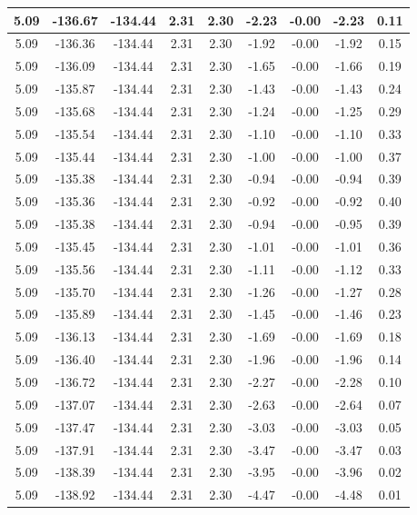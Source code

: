 \begin{table}[htbp]
\begin{adjustbox}{angle=90}
\begin{tabular}{|c|c|c|c|c|c|c|c|c|}
 5.09 & -136.67 & -134.44 & 2.31 & 2.30 & -2.23 & -0.00 & -2.23 & 0.11\\ \hline
 5.09 & -136.36 & -134.44 & 2.31 & 2.30 & -1.92 & -0.00 & -1.92 & 0.15\\ \hline
 5.09 & -136.09 & -134.44 & 2.31 & 2.30 & -1.65 & -0.00 & -1.66 & 0.19\\ \hline
 5.09 & -135.87 & -134.44 & 2.31 & 2.30 & -1.43 & -0.00 & -1.43 & 0.24\\ \hline
 5.09 & -135.68 & -134.44 & 2.31 & 2.30 & -1.24 & -0.00 & -1.25 & 0.29\\ \hline
 5.09 & -135.54 & -134.44 & 2.31 & 2.30 & -1.10 & -0.00 & -1.10 & 0.33\\ \hline
 5.09 & -135.44 & -134.44 & 2.31 & 2.30 & -1.00 & -0.00 & -1.00 & 0.37\\ \hline
 5.09 & -135.38 & -134.44 & 2.31 & 2.30 & -0.94 & -0.00 & -0.94 & 0.39\\ \hline
 5.09 & -135.36 & -134.44 & 2.31 & 2.30 & -0.92 & -0.00 & -0.92 & 0.40\\ \hline
 5.09 & -135.38 & -134.44 & 2.31 & 2.30 & -0.94 & -0.00 & -0.95 & 0.39\\ \hline
 5.09 & -135.45 & -134.44 & 2.31 & 2.30 & -1.01 & -0.00 & -1.01 & 0.36\\ \hline
 5.09 & -135.56 & -134.44 & 2.31 & 2.30 & -1.11 & -0.00 & -1.12 & 0.33\\ \hline
 5.09 & -135.70 & -134.44 & 2.31 & 2.30 & -1.26 & -0.00 & -1.27 & 0.28\\ \hline
 5.09 & -135.89 & -134.44 & 2.31 & 2.30 & -1.45 & -0.00 & -1.46 & 0.23\\ \hline
 5.09 & -136.13 & -134.44 & 2.31 & 2.30 & -1.69 & -0.00 & -1.69 & 0.18\\ \hline
 5.09 & -136.40 & -134.44 & 2.31 & 2.30 & -1.96 & -0.00 & -1.96 & 0.14\\ \hline
 5.09 & -136.72 & -134.44 & 2.31 & 2.30 & -2.27 & -0.00 & -2.28 & 0.10\\ \hline
 5.09 & -137.07 & -134.44 & 2.31 & 2.30 & -2.63 & -0.00 & -2.64 & 0.07\\ \hline
 5.09 & -137.47 & -134.44 & 2.31 & 2.30 & -3.03 & -0.00 & -3.03 & 0.05\\ \hline
 5.09 & -137.91 & -134.44 & 2.31 & 2.30 & -3.47 & -0.00 & -3.47 & 0.03\\ \hline
 5.09 & -138.39 & -134.44 & 2.31 & 2.30 & -3.95 & -0.00 & -3.96 & 0.02\\ \hline
 5.09 & -138.92 & -134.44 & 2.31 & 2.30 & -4.47 & -0.00 & -4.48 & 0.01\\ \hline

\end{tabular}
\end{adjustbox}
\end{table}
